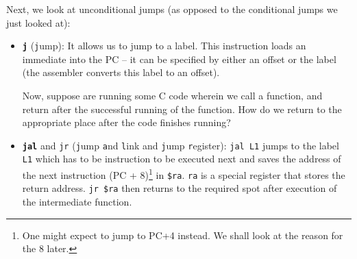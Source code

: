 \documentclass{article}
\begin{document}
		Next, we look at unconditional jumps (as opposed to the conditional jumps we just looked at):

		\begin{itemize}
			\item \textbf{\texttt{j}} (\texttt{j}ump): It allows us to jump to a label. This instruction loads an immediate into the PC -- it can be specified by either an offset or the label (the assembler converts this label to an offset).

			Now, suppose are running some C code wherein we call a function, and return after the successful running of the function. How do we return to the appropriate place after the code finishes running?

			\item \texttt{\textbf{jal}} and \texttt{jr} (\texttt{j}ump \texttt{a}nd \texttt{l}ink and \texttt{j}ump \texttt{r}egister): \texttt{jal L1} jumps to the label \texttt{L1} which has to be instruction to be executed next and saves the address of the next instruction (PC + 8)\footnote{One might expect to jump to PC+4 instead. We shall look at the reason for the 8 later.} in \texttt{\$ra}. \texttt{ra} is a special register that stores the return address. \texttt{jr \$ra} then returns to the required spot after execution of the intermediate function.
		\end{itemize}
\end{document}
